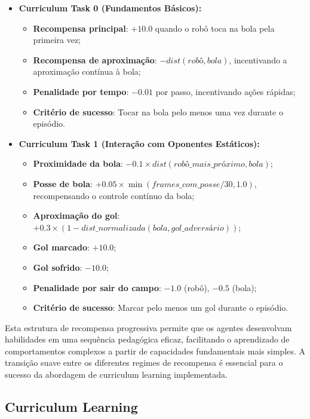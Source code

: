 \begin{itemize}
    \item \textbf{Curriculum Task 0 (Fundamentos Básicos):}
    \begin{itemize}
        \item \textbf{Recompensa principal}: $+10.0$ quando o robô toca na bola pela primeira vez;
        \item \textbf{Recompensa de aproximação}: $-dist(robô, bola)$, incentivando a aproximação contínua à bola;
        \item \textbf{Penalidade por tempo}: $-0.01$ por passo, incentivando ações rápidas;
        \item \textbf{Critério de sucesso}: Tocar na bola pelo menos uma vez durante o episódio.
    \end{itemize}
    
    \item \textbf{Curriculum Task 1 (Interação com Oponentes Estáticos):}
    \begin{itemize}
        \item \textbf{Proximidade da bola}: $-0.1 \times dist(robô\_mais\_próximo, bola)$;  
        \item \textbf{Posse de bola}: $+0.05 \times \min(frames\_com\_posse / 30, 1.0)$, recompensando o controle contínuo da bola;
        \item \textbf{Aproximação do gol}: $+0.3 \times (1 - dist\_normalizada(bola, gol\_adversário))$;
        \item \textbf{Gol marcado}: $+10.0$;
        \item \textbf{Gol sofrido}: $-10.0$;
        \item \textbf{Penalidade por sair do campo}: $-1.0$ (robô), $-0.5$ (bola);
        \item \textbf{Critério de sucesso}: Marcar pelo menos um gol durante o episódio.
    \end{itemize}
\end{itemize}

Esta estrutura de recompensa progressiva permite que os agentes desenvolvam habilidades em uma sequência pedagógica eficaz, facilitando o aprendizado de comportamentos complexos a partir de capacidades fundamentais mais simples. A transição suave entre os diferentes regimes de recompensa é essencial para o sucesso da abordagem de curriculum learning implementada.

\subsection{Curriculum Learning}

